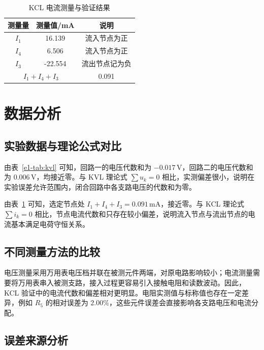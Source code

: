 \begin{table}[H]
    \centering
    \caption{KCL 电流测量与验证结果}
    \label{e1-tab:kcl}
    \begin{tabular}{ccc}
        \toprule
        测量量 & 测量值/mA & 说明 \\
        \midrule
        \(I_1\) & 16.139 & 流入节点为正 \\
        \(I_4\) & 6.506 & 流入节点为正 \\
        \(I_3\) & -22.554 & 流出节点记为负 \\
        \midrule
        \multicolumn{2}{c}{\(I_1+I_4+I_3\)} & 0.091 \\
        \bottomrule
    \end{tabular}
\end{table}

\section{数据分析}

\subsection{实验数据与理论公式对比}

由表~\ref{e1-tab:kvl} 可知，回路一的电压代数和为 \(-0.017\,\mathrm{V}\)，回路二的电压代数和为 \(0.006\,\mathrm{V}\)，均接近零。与 KVL 理论式 \(\sum u_k=0\) 相比，实测偏差很小，说明在实验误差允许范围内，闭合回路中各支路电压的代数和为零。

由表~\ref{e1-tab:kcl} 可知，选定节点处 \(I_1+I_4+I_3=0.091\,\mathrm{mA}\)，接近零。与 KCL 理论式 \(\sum i_k=0\) 相比，节点电流代数和只存在较小偏差，说明流入节点与流出节点的电流基本满足电荷守恒关系。

\subsection{不同测量方法的比较}

电压测量采用万用表电压档并联在被测元件两端，对原电路影响较小；电流测量需要将万用表串入被测支路，接入过程更容易引入接触电阻和读数波动。因此，KCL 验证中的电流代数和偏差相对更明显。电阻实测值与标称值也存在一定差异，例如 \(R_5\) 的相对误差为 \(2.00\%\)，这些元件误差会直接影响各支路电压和电流分配。

\subsection{误差来源分析}

